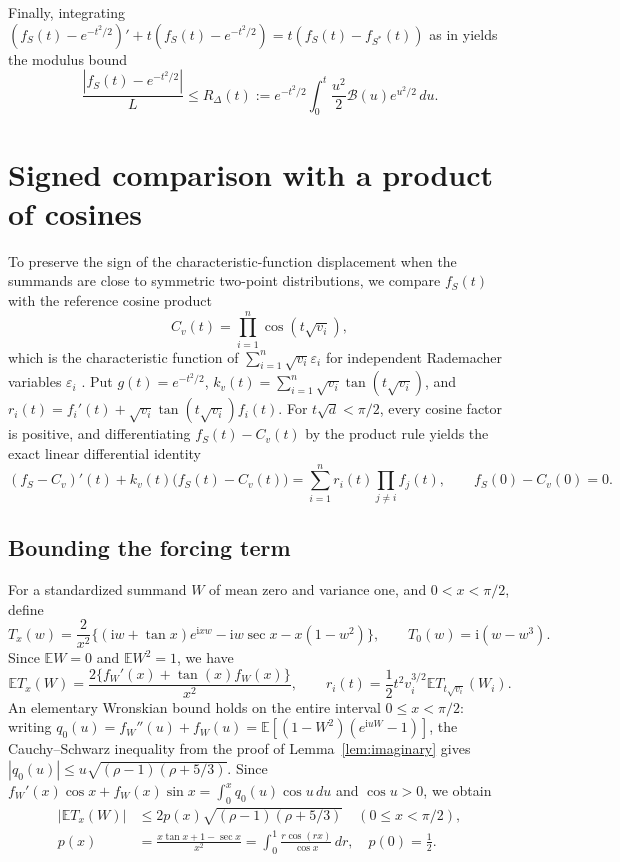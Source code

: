 \documentclass[11pt]{article}
\numberwithin{equation}{section}
\theoremstyle{remark}
\newcommand{\E}{\mathbb E}
\newcommand{\ii}{\mathrm i}
\begin{document}
Finally, integrating $(f_S(t)-e^{-t^2/2})'+t(f_S(t)-e^{-t^2/2})=t(f_S(t)-f_{S^*}(t))$
as in \citet[Lemma~3]{Tyurin2009} yields the modulus bound
\begin{equation}\label{eq:ode-comparison}
 \frac{|f_S(t)-e^{-t^2/2}|}{L}
 \le R_\Delta(t):=e^{-t^2/2}
       \int_0^t \frac{u^2}{2}\mathcal B(u)e^{u^2/2}\,du.
\end{equation}

\section{Signed comparison with a product of cosines}\label{sec:current-reference}

To preserve the sign of the characteristic-function displacement when the
summands are close to symmetric two-point distributions, we compare $f_S(t)$
with the reference cosine product
\[
 C_v(t)=\prod_{i=1}^n\cos(t\sqrt{v_i}),
\]
which is the characteristic function of $\sum_{i=1}^n\sqrt{v_i}\varepsilon_i$
for independent Rademacher variables $\varepsilon_i$ \citep{MattnerShevtsova2019}.
Put $g(t)=e^{-t^2/2}$, $k_v(t)=\sum_{i=1}^n\sqrt{v_i}\tan(t\sqrt{v_i})$, and
$r_i(t)=f_i'(t)+\sqrt{v_i}\tan(t\sqrt{v_i})f_i(t)$. For $t\sqrt d<\pi/2$,
every cosine factor is positive, and differentiating $f_S(t)-C_v(t)$ by the
product rule yields the exact linear differential identity
\begin{equation}\label{eq:current-reference-identity}
 (f_S-C_v)'(t)+k_v(t)\bigl(f_S(t)-C_v(t)\bigr)
       =\sum_{i=1}^n r_i(t)\prod_{j\ne i}f_j(t),
 \qquad f_S(0)-C_v(0)=0.
\end{equation}

\subsection{Bounding the forcing term}

For a standardized summand $W$ of mean zero and variance one, and
$0<x<\pi/2$, define
\begin{equation}\label{eq:current-transformed-target}
 T_x(w)=\frac2{x^2}\bigl\{(\ii w+\tan x)e^{\ii xw}
               -\ii w\sec x-x(1-w^2)\bigr\},\qquad T_0(w)=\ii (w-w^3).
\end{equation}
Since $\E W=0$ and $\E W^2=1$, we have
\[
 \E T_x(W)=\frac{2\{f_W'(x)+\tan(x)f_W(x)\}}{x^2},
 \qquad r_i(t)=\frac12t^2v_i^{3/2}\E T_{t\sqrt{v_i}}(W_i).
\]
An elementary Wronskian bound holds on the entire interval $0\le x<\pi/2$:
writing $q_0(u)=f_W''(u)+f_W(u)=\E[(1-W^2)(e^{\ii uW}-1)]$, the
Cauchy--Schwarz inequality from the proof of Lemma~\ref{lem:imaginary} gives
$|q_0(u)|\le u\sqrt{(\rho-1)(\rho+5/3)}$. Since
$f_W'(x)\cos x+f_W(x)\sin x=\int_0^xq_0(u)\cos u\,du$ and $\cos u>0$, we
obtain
\begin{equation}\label{eq:current-elementary-energy}
 \begin{aligned}
 |\E T_x(W)|&\le2p(x)\sqrt{(\rho-1)(\rho+5/3)}
                  \quad(0\le x<\pi/2),\\
 p(x)&=\frac{x\tan x+1-\sec x}{x^2}=\int_0^1\frac{r\cos(rx)}{\cos x}\,dr,\quad p(0)=\frac12.
 \end{aligned}
\end{equation}
\end{document}

